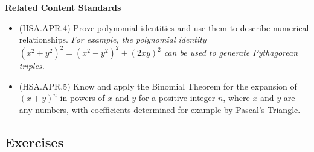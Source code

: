 \documentclass[
]{book}
\providecommand{\tightlist}{%
  \setlength{\itemsep}{0pt}\setlength{\parskip}{0pt}}
\newenvironment{standards}{}{}
\theoremstyle{definition}
\theoremstyle{definition}
\theoremstyle{definition}
\theoremstyle{definition}
\theoremstyle{remark}
\begin{document}
\begin{standards}

\begin{center}
\textbf{Related Content Standards}

\end{center}

\begin{itemize}
\tightlist
\item
  (HSA.APR.4) Prove polynomial identities and use them to describe numerical relationships. \textit{For example, the polynomial identity $(x^2 + y^2)^2 = (x^2 - y^2)^2 + (2xy)^2$ can be used to generate Pythagorean triples.}
\item
  (HSA.APR.5) Know and apply the Binomial Theorem for the expansion of \((x + y)^n\) in powers of \(x\) and \(y\) for a positive integer \(n\), where \(x\) and \(y\) are any numbers, with coefficients determined for example by Pascal's Triangle.\\
\end{itemize}

\end{standards}

\hypertarget{exercises-32}{%
\subsection{Exercises}\label{exercises-32}}
\end{document}
